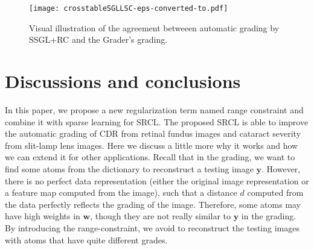 \documentclass[journal]{IEEEtran}
\begin{document}
%

\begin{figure}
	\centering

	\texttt{[image: crosstableSGLLSC-eps-converted-to.pdf]}


	\caption{Visual illustration of the agreement betweeen automatic grading by SSGL+RC and the Grader's grading.} \label{fig67}
\end{figure}
\section{Discussions and conclusions} \label{discuss}
In this paper, we propose a new regularization term named range constraint and combine it with sparse learning for SRCL. The proposed SRCL is able to improve the automatic grading of CDR from retinal fundus images and cataract severity from slit-lamp lens images.  Here we discuss a little more why it works and how we can extend it for other applications. Recall that in the grading, we want to find some atoms from the dictionary to reconstruct a testing image $\textbf{y}$. However, there is no perfect data representation  (either the original image representation or a feature map computed from the image), such that a distance $d$ computed from the data perfectly reflects the grading of the image. Therefore,  some atoms may have high weights in $\textbf{w}$, though they are not really similar to $\textbf{y}$ in the grading. By introducing the range-constraint, we avoid to reconstruct the testing images with atoms that have quite different grades.
\end{document}
